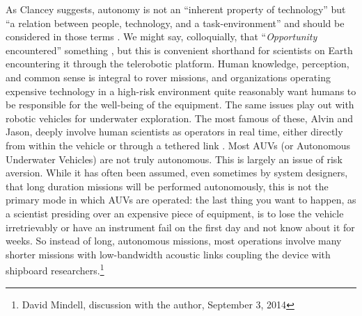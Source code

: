 As Clancey suggests, autonomy is not an ``inherent property of
technology'' but ``a relation between people, technology, and a
task-environment'' and should be considered in those terms \cite[p.
  119]{clancey}. We might say, colloquially, that 
``\emph{Opportunity} encountered'' something \cite[p. 8]{clancey}, but
this is convenient shorthand for scientists on Earth encountering it
through the telerobotic platform. Human knowledge,
perception, and common sense is integral to rover missions, and
organizations operating expensive 
technology in a high-risk environment quite reasonably want humans to
be responsible
for the well-being of the equipment. The same issues play out with
robotic vehicles for underwater exploration. The most famous of these,
Alvin and Jason, deeply involve human scientists as operators in real
time, either directly from within the vehicle or through a tethered
link \cite{NOAA1} \cite{NOAA2}. Most AUVs (or Autonomous Underwater
Vehicles) are not 
truly autonomous. This is largely an issue of risk
aversion. While it has often been assumed, even sometimes by system
designers, that long duration missions will be performed autonomously,
this is not the primary mode in which AUVs are operated: the last
thing you want to happen, as a scientist presiding over an expensive
piece of equipment, is to lose the vehicle irretrievably or have an
instrument fail on the first day and not know about it for weeks. So
instead of long, autonomous missions, most operations involve many
shorter missions with low-bandwidth acoustic links coupling the device with
shipboard researchers.\footnote{David Mindell, discussion with the
  author, September 3, 2014} 





